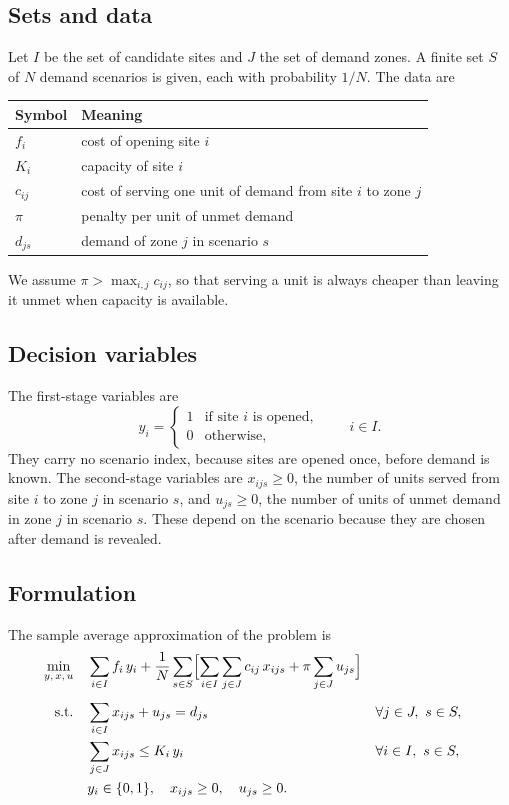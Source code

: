 \documentclass[11pt,a4paper]{article}
\begin{document}
\subsection{Sets and data}

Let $I$ be the set of candidate sites and $J$ the set of demand zones. A finite set
$S$ of $N$ demand scenarios is given, each with probability $1/N$. The data are
\begin{center}
\begin{tabular}{@{}ll@{}}
\toprule
Symbol & Meaning \\
\midrule
$f_i$    & cost of opening site $i$ \\
$K_i$    & capacity of site $i$ \\
$c_{ij}$ & cost of serving one unit of demand from site $i$ to zone $j$ \\
$\pi$    & penalty per unit of unmet demand \\
$d_{js}$ & demand of zone $j$ in scenario $s$ \\
\bottomrule
\end{tabular}
\end{center}
We assume $\pi > \max_{i,j} c_{ij}$, so that serving a unit is always cheaper than
leaving it unmet when capacity is available.

\subsection{Decision variables}

The first-stage variables are
\[
  y_i =
  \begin{cases}
    1 & \text{if site } i \text{ is opened},\\
    0 & \text{otherwise,}
  \end{cases}
  \qquad i \in I.
\]
They carry no scenario index, because sites are opened once, before demand is known.
The second-stage variables are $x_{ijs} \ge 0$, the number of units served from site
$i$ to zone $j$ in scenario $s$, and $u_{js} \ge 0$, the number of units of unmet
demand in zone $j$ in scenario $s$. These depend on the scenario because they are
chosen after demand is revealed.

\subsection{Formulation}

The sample average approximation of the problem is
\begin{align}
  \min_{y,\,x,\,u} \quad
    & \sum_{i \in I} f_i\, y_i
      + \frac{1}{N} \sum_{s \in S} \Bigl[ \sum_{i \in I} \sum_{j \in J} c_{ij}\, x_{ijs}
      + \pi \sum_{j \in J} u_{js} \Bigr] \label{eq:obj}\\[4pt]
  \text{s.t.} \quad
    & \sum_{i \in I} x_{ijs} + u_{js} = d_{js}
      && \forall j \in J,\ s \in S, \label{eq:balance}\\
    & \sum_{j \in J} x_{ijs} \le K_i\, y_i
      && \forall i \in I,\ s \in S, \label{eq:capacity}\\
    & y_i \in \{0,1\},\quad x_{ijs} \ge 0,\quad u_{js} \ge 0. \label{eq:domain}
\end{align}
\end{document}
